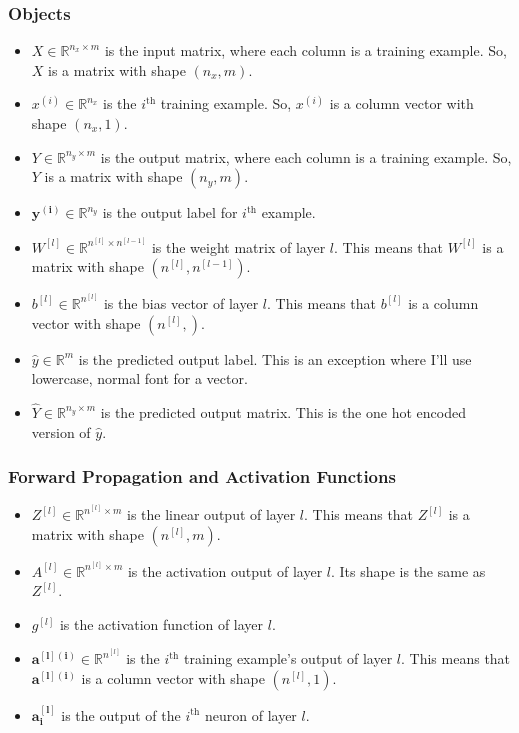 \hypertarget{objects}{%
\subsubsection{Objects}\label{objects}}

\begin{itemize}
\tightlist
\item
  \(X\in \mathbb{R}^{n_x\times m}\) is the input matrix, where each
  column is a training example. So, \(X\) is a matrix with shape
  \((n_x, m)\).
\item
  \(x^{(i)}\in \mathbb{R}^{n_x}\) is the \(i^{\text{th}}\) training
  example. So, \(x^{(i)}\) is a column vector with shape \((n_x, 1)\).
\item
  \(Y \in \mathbb{R}^{n_y\times m}\) is the output matrix, where each
  column is a training example. So, \(Y\) is a matrix with shape
  \((n_y, m)\).
\item
  \(\mathbf{y^{(i)}} \in \mathbb{R}^{n_y}\) is the output label for
  \(i^{\text{th}}\) example.
\item
  \(W^{[l]}\in \mathbb{R}^{n^{[l]}\times n^{[l-1]}}\) is the weight
  matrix of layer \(l\). This means that \(W^{[l]}\) is a matrix with
  shape \((n^{[l]}, n^{[l-1]})\).
\item
  \(b^{[l]}\in \mathbb{R}^{n^{[l]}}\) is the bias vector of layer \(l\).
  This means that \(b^{[l]}\) is a column vector with shape
  \((n^{[l]}, )\).
\item
  \(\hat{y} \in \mathbb{R}^{m}\) is the predicted output label. This is
  an exception where I'll use lowercase, normal font for a vector.
\item
  \(\hat{Y} \in \mathbb{R}^{n_y\times m}\) is the predicted output
  matrix. This is the one hot encoded version of \(\hat{y}\).
\end{itemize}

\hypertarget{forward-propagation-and-activation-functions}{%
\subsubsection{Forward Propagation and Activation
Functions}\label{forward-propagation-and-activation-functions}}

\begin{itemize}
\tightlist
\item
  \(Z^{[l]}\in \mathbb{R}^{n^{[l]}\times m}\) is the linear output of
  layer \(l\). This means that \(Z^{[l]}\) is a matrix with shape
  \((n^{[l]}, m)\).
\item
  \(A^{[l]}\in \mathbb{R}^{n^{[l]}\times m}\) is the activation output
  of layer \(l\). Its shape is the same as \(Z^{[l]}\).
\item
  \(g^{[l]}\) is the activation function of layer \(l\).
\item
  \(\mathbf{a^{[l]{(i)}}} \in \mathbb{R}^{n^{[l]}}\) is the
  \(i^{\text{th}}\) training example's output of layer \(l\). This means
  that \(\mathbf{a^{[l]{(i)}}}\) is a column vector with shape
  \((n^{[l]}, 1)\).
\item
  \(\mathbf{a^{[l]}_{i}}\) is the output of the \(i^{\text{th}}\) neuron
  of layer \(l\).
\end{itemize}

